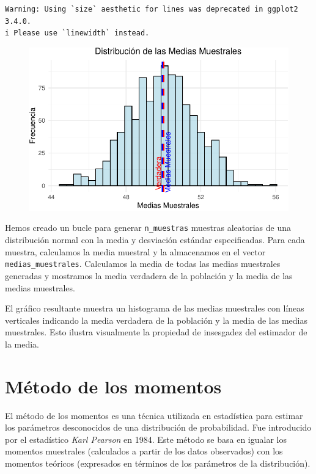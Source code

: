\documentclass[
  letterpaper,
  DIV=11,
  numbers=noendperiod]{scrreprt}
\begin{document}
\begin{tcolorbox}
\begin{verbatim}
Warning: Using `size` aesthetic for lines was deprecated in ggplot2 3.4.0.
i Please use `linewidth` instead.
\end{verbatim}

\begin{figure}[H]

{\centering \includegraphics{para_files/figure-pdf/inses1-1.pdf}

}

\end{figure}

Hemos creado un bucle para generar \texttt{n\_muestras} muestras
aleatorias de una distribución normal con la media y desviación estándar
especificadas. Para cada muestra, calculamos la media muestral y la
almacenamos en el vector \texttt{medias\_muestrales}. Calculamos la
media de todas las medias muestrales generadas y mostramos la media
verdadera de la población y la media de las medias muestrales.

El gráfico resultante muestra un histograma de las medias muestrales con
líneas verticales indicando la media verdadera de la población y la
media de las medias muestrales. Esto ilustra visualmente la propiedad de
insesgadez del estimador de la media.

\end{tcolorbox}

\hypertarget{muxe9todo-de-los-momentos}{%
\section{Método de los momentos}\label{muxe9todo-de-los-momentos}}

El método de los momentos es una técnica utilizada en estadística para
estimar los parámetros desconocidos de una distribución de probabilidad.
Fue introducido por el estadístico \emph{Karl Pearson} en 1984. Este
método se basa en igualar los momentos muestrales (calculados a partir
de los datos observados) con los momentos teóricos (expresados en
términos de los parámetros de la distribución).
\end{document}
